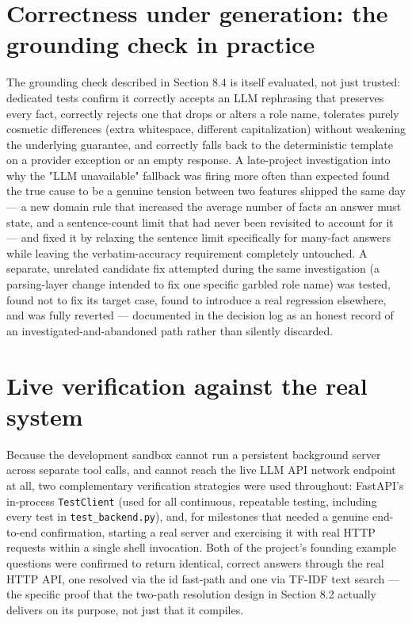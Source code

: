 \section{Correctness under generation: the grounding check in practice}
The grounding check described in Section 8.4 is itself evaluated, not just trusted: dedicated tests confirm it correctly accepts an LLM rephrasing that preserves every fact, correctly rejects one that drops or alters a role name, tolerates purely cosmetic differences (extra whitespace, different capitalization) without weakening the underlying guarantee, and correctly falls back to the deterministic template on a provider exception or an empty response. A late-project investigation into why the "LLM unavailable" fallback was firing more often than expected found the true cause to be a genuine tension between two features shipped the same day — a new domain rule that increased the average number of facts an answer must state, and a sentence-count limit that had never been revisited to account for it — and fixed it by relaxing the sentence limit specifically for many-fact answers while leaving the verbatim-accuracy requirement completely untouched. A separate, unrelated candidate fix attempted during the same investigation (a parsing-layer change intended to fix one specific garbled role name) was tested, found not to fix its target case, found to introduce a real regression elsewhere, and was fully reverted — documented in the decision log as an honest record of an investigated-and-abandoned path rather than silently discarded.

\section{Live verification against the real system}
Because the development sandbox cannot run a persistent background server across separate tool calls, and cannot reach the live LLM API network endpoint at all, two complementary verification strategies were used throughout: FastAPI's in-process \texttt{TestClient} (used for all continuous, repeatable testing, including every test in \texttt{test\_\allowbreak{}backend.py}), and, for milestones that needed a genuine end-to-end confirmation, starting a real server and exercising it with real HTTP requests within a single shell invocation. Both of the project's founding example questions were confirmed to return identical, correct answers through the real HTTP API, one resolved via the id fast-path and one via TF-IDF text search — the specific proof that the two-path resolution design in Section 8.2 actually delivers on its purpose, not just that it compiles.

